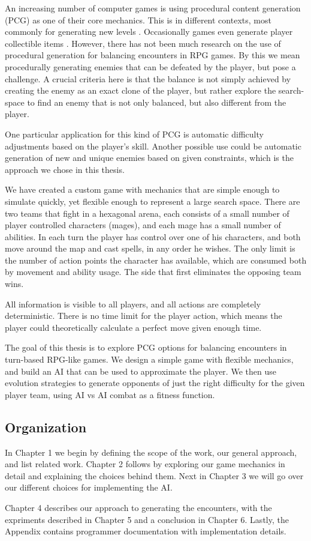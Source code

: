 
An increasing number of computer games is using procedural content generation
(PCG) as one of their core mechanics. This is in different contexts, most
commonly for generating new levels . Occasionally games
even generate player collectible items . However,
there has not been much research on the use of procedural generation for
balancing encounters in RPG games. By this we mean procedurally generating
enemies that can be defeated by the player, but pose a challenge. A crucial
criteria here is that the balance is not simply achieved by creating the enemy
as an exact clone of the player, but rather explore the search-space to find an
enemy that is not only balanced, but also different from the player.

One particular application for this kind of PCG is automatic difficulty
adjustments based on the player's skill. Another possible use could be
automatic generation of new and unique enemies based on given constraints,
which is the approach we chose in this thesis.

We have created a custom game with mechanics that are simple enough to simulate
quickly, yet flexible enough to represent a large search space. There are two
teams that fight in a hexagonal arena, each consists of a small number of
player controlled characters (mages), and each mage has a small number of
abilities. In each turn the player has control over one of his characters, and
both move around the map and cast spells, in any order he wishes. The only
limit is the number of action points the character has available, which are
consumed both by movement and ability usage. The side that first eliminates the
opposing team wins.

All information is visible to all players, and all actions are completely
deterministic. There is no time limit for the player action, which means the
player could theoretically calculate a perfect move given enough time.

The goal of this thesis is to explore PCG options for balancing encounters in
turn-based RPG-like games. We design a simple game with flexible mechanics, and
build an AI that can be used to approximate the player. We then use evolution strategies
to generate opponents of just the right difficulty for the given player team, using AI vs
AI combat as a fitness function.

\subsection*{Organization}

In Chapter 1 we begin by defining the scope of the work, our general approach,
and list related work. Chapter 2 follows by exploring our game mechanics in
detail and explaining the choices behind them. Next in Chapter 3 we will go
over our different choices for implementing the AI.

Chapter 4 describes our approach to generating the encounters, with the expriments
described in Chapter 5 and a conclusion in Chapter 6. Lastly, the Appendix contains
programmer documentation with implementation details.
